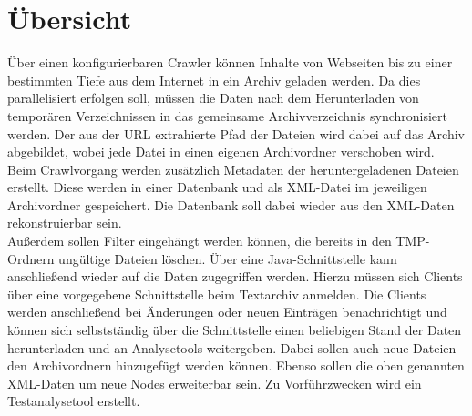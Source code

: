\chapter{Übersicht}
Über einen konfigurierbaren Crawler können Inhalte von Webseiten bis zu einer bestimmten Tiefe
aus dem Internet in ein Archiv geladen werden. Da dies parallelisiert erfolgen soll,
müssen die Daten nach dem Herunterladen von temporären Verzeichnissen in das gemeinsame
Archivverzeichnis synchronisiert werden. Der aus der URL extrahierte Pfad der Dateien wird
dabei auf das Archiv abgebildet, wobei jede Datei in einen eigenen Archivordner verschoben wird.\\

Beim Crawlvorgang werden zusätzlich Metadaten der heruntergeladenen Dateien erstellt. 
Diese werden in einer Datenbank und als XML-Datei im jeweiligen Archivordner gespeichert.
Die Datenbank soll dabei wieder aus den XML-Daten rekonstruierbar sein. \\ 

Außerdem sollen Filter eingehängt werden können, die bereits in den TMP-Ordnern ungültige Dateien löschen.
Über eine Java-Schnittstelle kann anschließend wieder auf die Daten zugegriffen werden.
Hierzu müssen sich Clients über eine vorgegebene Schnittstelle beim Textarchiv anmelden.
Die Clients werden anschließend bei Änderungen oder neuen Einträgen benachrichtigt und können sich selbstständig über die Schnittstelle einen beliebigen Stand der Daten herunterladen und an Analysetools weitergeben.
Dabei sollen auch neue Dateien den Archivordnern hinzugefügt werden können.
Ebenso sollen die oben genannten XML-Daten um neue Nodes erweiterbar sein.
Zu Vorführzwecken wird ein Testanalysetool erstellt.

\newpage 

